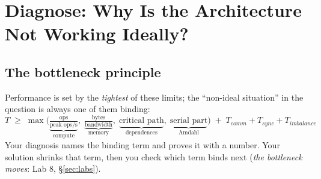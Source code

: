 \section{Diagnose: Why Is the Architecture Not Working Ideally?}\label{ch:diag}

\subsection{The bottleneck principle}
Performance is set by the \emph{tightest} of these limits; the ``non-ideal situation'' in the question is always one of them binding:
\[
T \;\ge\; \max\Big(\underbrace{\tfrac{\text{ops}}{\text{peak ops/s}}}_{\text{compute}},\;
\underbrace{\tfrac{\text{bytes}}{\text{bandwidth}}}_{\text{memory}},\;
\underbrace{\text{critical path}}_{\text{dependences}},\;
\underbrace{\text{serial part}}_{\text{Amdahl}}\Big) \;+\; T_{comm}+T_{sync}+T_{imbalance}
\]
Your diagnosis names the binding term and proves it with a number. Your solution shrinks that term, then you check which term binds next (\emph{the bottleneck moves}: Lab 8, \S\ref{sec:labs}).

